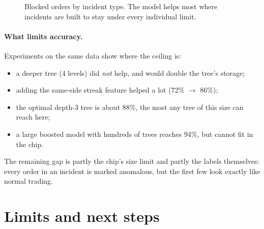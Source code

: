 \documentclass[11pt,a4paper]{article}
\begin{document}
\begin{figure}[h]
\centering
{}
\caption{Blocked orders by incident type. The model helps most where incidents are built to stay
under every individual limit.}
\end{figure}

\paragraph{What limits accuracy.}
Experiments on the same data show where the ceiling is:
\begin{itemize}
  \item a deeper tree (4 levels) did \emph{not} help, and would double the tree's storage;
  \item adding the same-side streak feature helped a lot (72\% $\to$ 86\%);
  \item the optimal depth-3 tree is about 88\%, the most any tree of this size can reach here;
  \item a large boosted model with hundreds of trees reaches 94\%, but cannot fit in the chip.
\end{itemize}
The remaining gap is partly the chip's size limit and partly the labels themselves: every order
in an incident is marked anomalous, but the first few look exactly like normal trading.

\section{Limits and next steps}
\end{document}
